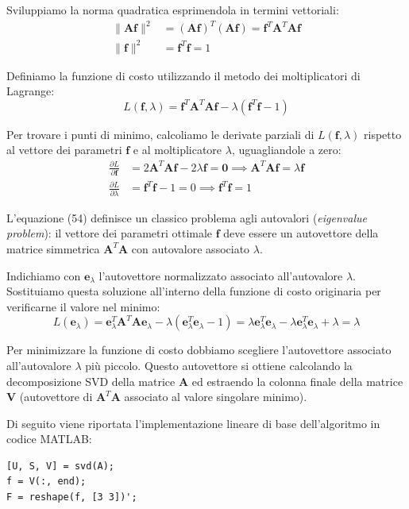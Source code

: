 ﻿\documentclass[11pt, a4paper]{article}
\begin{document}
Sviluppiamo la norma quadratica esprimendola in termini vettoriali:
\begin{align*}
\lVert\bm{A}\bm{f}\rVert^2 &= (\bm{A}\bm{f})^T (\bm{A}\bm{f}) = \bm{f}^T \bm{A}^T \bm{A} \bm{f} \\
\lVert\bm{f}\rVert^2 &= \bm{f}^T \bm{f} = 1
\end{align*}

Definiamo la funzione di costo utilizzando il metodo dei moltiplicatori di Lagrange:
\begin{equation}
L(\bm{f}, \lambda) = \bm{f}^T \bm{A}^T \bm{A} \bm{f} - \lambda (\bm{f}^T \bm{f} - 1)
\end{equation}

Per trovare i punti di minimo, calcoliamo le derivate parziali di $L(\bm{f}, \lambda)$ rispetto al vettore dei parametri $\bm{f}$ e al moltiplicatore $\lambda$, uguagliandole a zero:
\begin{align}
\frac{\partial L}{\partial \bm{f}} &= 2 \bm{A}^T \bm{A} \bm{f} - 2 \lambda \bm{f} = \bm{0} \implies \bm{A}^T \bm{A} \bm{f} = \lambda \bm{f} \\
\frac{\partial L}{\partial \lambda} &= \bm{f}^T \bm{f} - 1 = 0 \implies \bm{f}^T \bm{f} = 1
\end{align}

L'equazione (54) definisce un classico problema agli autovalori (\emph{eigenvalue problem}): il vettore dei parametri ottimale $\bm{f}$ deve essere un autovettore della matrice simmetrica $\bm{A}^T \bm{A}$ con autovalore associato $\lambda$.

Indichiamo con $\bm{e}_{\lambda}$ l'autovettore normalizzato associato all'autovalore $\lambda$. Sostituiamo questa soluzione all'interno della funzione di costo originaria per verificarne il valore nel minimo:
\begin{equation}
L(\bm{e}_{\lambda}) = \bm{e}_{\lambda}^T \bm{A}^T \bm{A} \bm{e}_{\lambda} - \lambda (\bm{e}_{\lambda}^T \bm{e}_{\lambda} - 1) = \lambda \bm{e}_{\lambda}^T \bm{e}_{\lambda} - \lambda \bm{e}_{\lambda}^T \bm{e}_{\lambda} + \lambda = \lambda
\end{equation}

Per minimizzare la funzione di costo dobbiamo scegliere l'autovettore associato all'autovalore $\lambda$ più piccolo. Questo autovettore si ottiene calcolando la decomposizione SVD della matrice $\bm{A}$ ed estraendo la colonna finale della matrice $\bm{V}$ (autovettore di $\bm{A}^T\bm{A}$ associato al valore singolare minimo).

Di seguito viene riportata l'implementazione lineare di base dell'algoritmo in codice MATLAB:
\begin{verbatim}
[U, S, V] = svd(A);
f = V(:, end);
F = reshape(f, [3 3])';
\end{verbatim}
\end{document}
